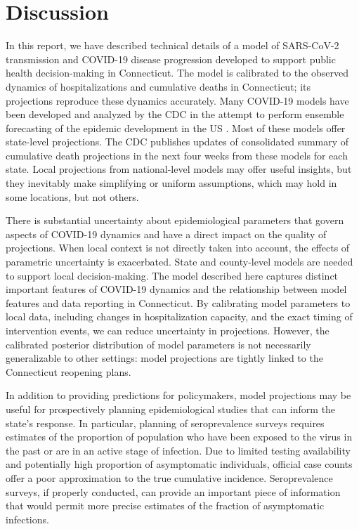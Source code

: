 \documentclass[11pt]{article}
\begin{document}

\section{Discussion}

In this report, we have described technical details of a model of SARS-CoV-2 transmission and COVID-19 disease progression developed to support public health decision-making in Connecticut.  The model is calibrated to the observed dynamics of hospitalizations and cumulative deaths in Connecticut; its projections reproduce these dynamics accurately.  Many COVID-19 models have been developed and analyzed by the CDC in the attempt to perform ensemble forecasting of the epidemic development in the US \citep{cdc2020covid19forecasts}. Most of these models offer state-level projections. The CDC publishes updates of consolidated summary of cumulative death projections in the next four weeks from these models for each state. Local projections from national-level models may offer useful insights, but they inevitably make simplifying or uniform assumptions, which may hold in some locations, but not others. 


There is substantial uncertainty about epidemiological parameters that govern aspects of COVID-19 dynamics and have a direct impact on the quality of projections. When local context is not directly taken into account, the effects of parametric uncertainty is exacerbated.  State and county-level models are needed to support local decision-making.  The model described here captures distinct important features of COVID-19 dynamics and the relationship between model features and data reporting in Connecticut.  By calibrating model parameters to local data, including changes in hospitalization capacity, and the exact timing of intervention events, we can reduce uncertainty in projections. However, the calibrated posterior distribution of model parameters is not necessarily generalizable to other settings: model projections are tightly linked to the Connecticut reopening plans. 

In addition to providing predictions for policymakers, model projections may be useful for prospectively planning epidemiological studies that can inform the state's response.  In particular, planning of seroprevalence surveys requires estimates of the proportion of population who have been exposed to the virus in the past or are in an active stage of infection. Due to limited testing availability and potentially high proportion of asymptomatic individuals, official case counts offer a poor approximation to the true cumulative incidence. Seroprevalence surveys, if properly conducted, can provide an important piece of information that would permit more precise estimates of the fraction of asymptomatic infections. 
\end{document}
